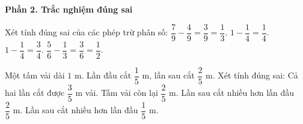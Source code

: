 \textbf{Phần 2. Trắc nghiệm đúng sai}

\begin{ex} %
Xét tính đúng sai của các phép trừ phân số:
\choiceTF
{\True $\dfrac{7}{9} - \dfrac{4}{9} = \dfrac{3}{9} = \dfrac{1}{3}$.}
{$1 - \dfrac{1}{4} = \dfrac{1}{4}$.}
{\True $1 - \dfrac{1}{4} = \dfrac{3}{4}$.}
{\True $\dfrac{5}{6} - \dfrac{1}{3} = \dfrac{3}{6} = \dfrac{1}{2}$.}
\end{ex}

\begin{ex} %
Một tấm vải dài $1\text{ m}$. Lần đầu cắt $\dfrac{1}{5}\text{ m}$, lần sau cắt $\dfrac{2}{5}\text{ m}$. Xét tính đúng sai:
\choiceTF
{\True Cả hai lần cắt được $\dfrac{3}{5}\text{ m}$ vải.}
{\True Tấm vải còn lại $\dfrac{2}{5}\text{ m}$.}
{Lần sau cắt nhiều hơn lần đầu $\dfrac{2}{5}\text{ m}$.}
{\True Lần sau cắt nhiều hơn lần đầu $\dfrac{1}{5}\text{ m}$.}
\end{ex}

